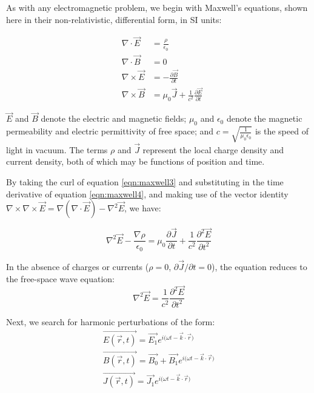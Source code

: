 As with any electromagnetic problem, we begin with Maxwell's equations, shown here in their non-relativistic, differential form, in SI units:

\begin{eqnarray}
&\nabla \cdot \vec{E}& = \frac{\rho}{\epsilon_0} \label{eqn:maxwell1}\\
&\nabla \cdot \vec{B}& = 0 \label{eqn:maxwell2}\\
&\nabla \times \vec{E}& = -\frac{\partial \vec{B}}{\partial t} \label{eqn:maxwell3}\\
&\nabla \times \vec{B}& = \mu_0 \vec{J} + \frac{1}{c^2}\frac{\partial \vec{E}}{\partial t} \label{eqn:maxwell4}
\end{eqnarray}

$\vec{E}$ and $\vec{B}$ denote the electric and magnetic fields; $\mu_0$ and $\epsilon_0$ denote the magnetic permeability and electric permittivity of free space; and $c=\sqrt{\frac{1}{\mu_0\epsilon_0}}$ is the speed of light in vacuum. The terms $\rho$ and $\vec{J}$ represent the local charge density and current density, both of which may be functions of position and time.

By taking the curl of equation \eqref{eqn:maxwell3} and substituting in the time derivative of equation \eqref{eqn:maxwell4}, and making use of the vector identity $\nabla \times \nabla \times \vec{E} = \nabla(\nabla \cdot \vec{E}) - \nabla^2\vec{E}$, we have:

\begin{equation}
\nabla^2\vec{E} - \frac{\nabla\rho}{\epsilon_0} = \mu_0 \frac{\partial \vec{J}}{\partial t} + \frac{1}{c^2}\frac{\partial^2\vec{E}}{\partial t^2}
\label{eqn:dielectric_tensor_derivation_1}
\end{equation}

In the absence of charges or currents ($\rho=0$, $\partial\vec{J}/\partial t=0$), the equation reduces to the free-space wave equation:
\begin{equation}
\nabla^2\vec{E} = \frac{1}{c^2}\frac{\partial^2\vec{E}}{\partial t^2}
\end{equation}

Next, we search for harmonic perturbations of the form:
\begin{eqnarray}
\vec{E(\vec{r},t)} = \vec{E_1}e^{{i (\omega t - \vec{k}\cdot \vec{r}})} \label{eqn:linear1}\\ 
\vec{B(\vec{r},t)} = \vec{B_0} + \vec{B_1}e^{{i (\omega t - \vec{k}\cdot \vec{r}})} \label{eqn:linear2}\\
\vec{J(\vec{r},t)} = \vec{J_1}e^{{i (\omega t - \vec{k}\cdot \vec{r}})}\label{eqn:linear3} 
\end{eqnarray}

